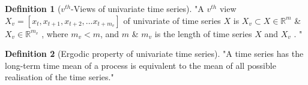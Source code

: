 \documentclass[a4paper, fleqn]{cas-sc}
\theoremstyle{definition}
\newtheorem{definition}{Definition}[section]
\theoremstyle{remark}
\begin{document}
  \begin{definition}[$v^{th}$-Views of univariate time series]\label{v uts}
    "A $v^{th}$ view $X_v=[ x_t, x_{t+1}, x_{t+2}, ... x_{t+m_v} ]$ of univariate of time series $X$ is $X_v \subset X \in \mathbb{R}^{m}$ \& $X_v \in \mathbb{R}^{m_v}$ ,  where $m_{v} < m$,  and $m$ \& $m_v$ is the length of time series $X$ and $X_v$ . "
  \end{definition}

  \begin{definition}[Ergodic property of univariate time series]\label{ep uv}
    "A time series has the long-term time mean of a process is equivalent to the mean of all possible realisation of the time series."    
  \end{definition}
\end{document}
